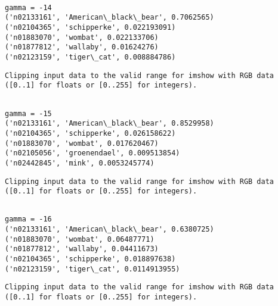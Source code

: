 \documentclass[11pt]{article}
\begin{document}
    \begin{Verbatim}[commandchars=\\\{\}]

gamma = -14
('n02133161', 'American\_black\_bear', 0.7062565)
('n02104365', 'schipperke', 0.022193091)
('n01883070', 'wombat', 0.022133706)
('n01877812', 'wallaby', 0.01624276)
('n02123159', 'tiger\_cat', 0.008884786)

    \end{Verbatim}

    \begin{Verbatim}[commandchars=\\\{\}]
Clipping input data to the valid range for imshow with RGB data ([0..1] for floats or [0..255] for integers).

    \end{Verbatim}

    \begin{Verbatim}[commandchars=\\\{\}]

gamma = -15
('n02133161', 'American\_black\_bear', 0.8529958)
('n02104365', 'schipperke', 0.026158622)
('n01883070', 'wombat', 0.017620467)
('n02105056', 'groenendael', 0.009513854)
('n02442845', 'mink', 0.0053245774)

    \end{Verbatim}

    \begin{Verbatim}[commandchars=\\\{\}]
Clipping input data to the valid range for imshow with RGB data ([0..1] for floats or [0..255] for integers).

    \end{Verbatim}

    \begin{Verbatim}[commandchars=\\\{\}]

gamma = -16
('n02133161', 'American\_black\_bear', 0.6380725)
('n01883070', 'wombat', 0.06487771)
('n01877812', 'wallaby', 0.04411673)
('n02104365', 'schipperke', 0.018897638)
('n02123159', 'tiger\_cat', 0.0114913955)

    \end{Verbatim}

    \begin{Verbatim}[commandchars=\\\{\}]
Clipping input data to the valid range for imshow with RGB data ([0..1] for floats or [0..255] for integers).

    \end{Verbatim}
\end{document}
